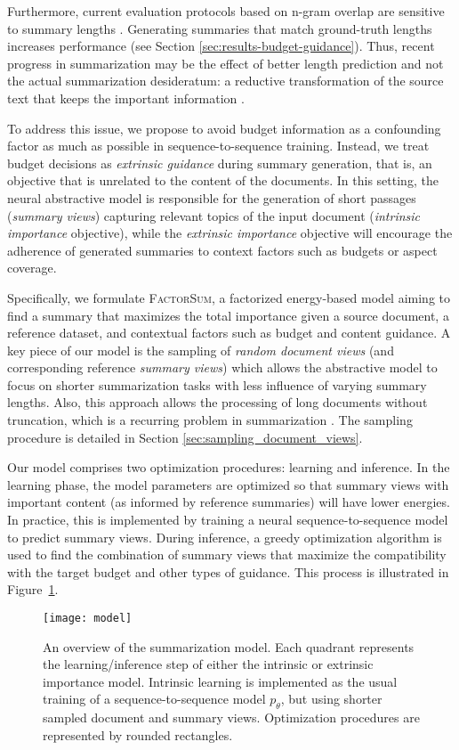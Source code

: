 \documentclass[11pt,table]{article}
\newcommand{\modelname}{FactorSum}
\begin{document}
Furthermore, current evaluation protocols based on n-gram overlap are sensitive to summary lengths \cite{sun2019compare}. Generating summaries that match ground-truth lengths increases performance (see Section \ref{sec:results-budget-guidance}). Thus, recent progress in summarization may be the effect of better length prediction and not the actual summarization desideratum: a reductive transformation of the source text that keeps the important information \citep{jones1999automatic}.

To address this issue, we propose to avoid budget information as a confounding factor as much as possible in sequence-to-sequence training. Instead, we treat budget decisions as \emph{extrinsic guidance} during summary generation, that is, an objective that is unrelated to the content of the documents. In this setting, the neural abstractive model is responsible for the generation of short passages (\emph{summary views}) capturing relevant topics of the input document (\emph{intrinsic importance} objective), while the \emph{extrinsic importance} objective will encourage the adherence of generated summaries to context factors such as budgets or aspect coverage.

Specifically, we formulate \textsc{\modelname}, a factorized energy-based model \citep{lecun2006tutorial} aiming to find a summary that maximizes the total importance given a source document, a reference dataset, and contextual factors such as budget and content guidance. A key piece of our model is the sampling of \emph{random document views} (and corresponding reference \emph{summary views}) which allows the abstractive model to focus on shorter summarization tasks with less influence of varying summary lengths. Also, this approach allows the processing of long documents without truncation, which is a recurring problem in summarization \citep{beltagy2020longformer,zaheer2020big}. The sampling procedure is detailed in Section \ref{sec:sampling_document_views}.

Our model comprises two optimization procedures: learning and inference. In the learning phase, the model parameters are optimized so that summary views with important content (as informed by reference summaries) will have lower energies. In practice, this is implemented by training a neural sequence-to-sequence model to predict summary views. During inference, a greedy optimization algorithm is used to find the combination of summary views that maximize the compatibility with the target budget and other types of guidance. This process is illustrated in Figure~\ref{fig:model_overview}.
\begin{figure}
    \centering
    \texttt{[image: model]}
    \caption{An overview of the summarization model. Each quadrant represents the learning/inference step of either the intrinsic or extrinsic importance model. Intrinsic learning is implemented as the usual training of a sequence-to-sequence model $p_{\theta}$, but using shorter sampled document and summary views. Optimization procedures are represented by rounded rectangles.}\label{fig:model_overview}
\end{figure}
\end{document}
